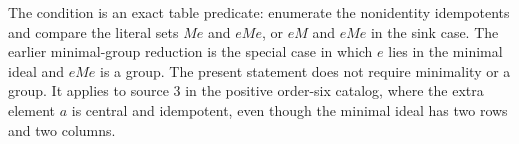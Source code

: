 \begin{remark*}
The condition is an exact table predicate: enumerate the nonidentity
idempotents and compare the literal sets $Me$ and $eMe$, or $eM$
and $eMe$ in the sink case.  The earlier minimal-group reduction is
the special case in which $e$ lies in the minimal ideal and $eMe$
is a group.  The present statement does not require minimality or a
group.  It applies to source $3$ in the positive order-six catalog,
where the extra element $a$ is central and idempotent, even though
the minimal ideal has two rows and two columns.
\end{remark*}
